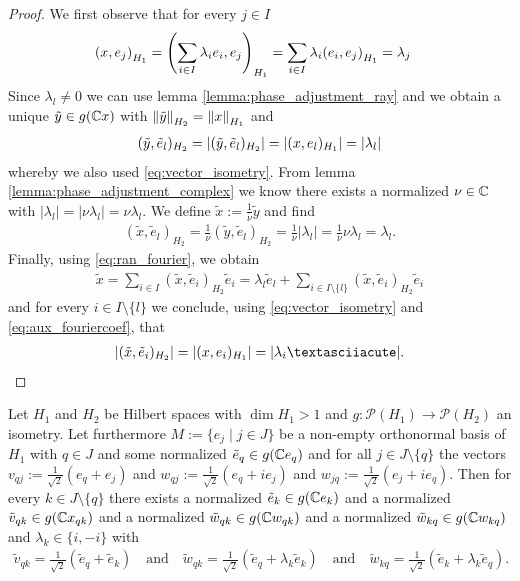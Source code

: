 \begin{proof}
	We first observe that for every $j \in I$ 
	\begin{align}
		\pbraces{x, e_j}_{H_1} &= \pbraces{\sum_{i \in I} \lambda_i e_i, e_j}_{H_1} = \sum_{i \in I} \lambda_i \pbraces{e_i, e_j}_{H_1} = \lambda_j \label{eq:aux_fouriercoef}
	\end{align}
	Since $\lambda_l \neq 0$ we can use lemma \ref{lemma:phase_adjustment_ray} and we obtain a unique $\tilde{y} \in g(\C x)$ with $\norm[H_2]{\tilde{y}} = \norm[H_1]{x}$ and 
	\begin{align*}
		(\tilde{y}, \tilde{e}_l)_{H_2} = |(\tilde{y}, \tilde{e}_l)_{H_2}| = |(x, e_l)_{H_1}| = \vbraces{\lambda_l}
	\end{align*}
	whereby we also used \eqref{eq:vector_isometry}. From lemma \ref{lemma:phase_adjustment_complex} we know there exists a normalized $\nu \in \C$ with $|\lambda_l| = |\nu \lambda_l| = \nu \lambda_l$. We define $\tilde{x} := \frac{1}{\nu} \tilde{y}$ and find
	\begin{align*}
		(\tilde{x}, \tilde{e}_l)_{H_2} = \frac{1}{\nu} (\tilde{y}, \tilde{e}_l)_{H_2} = \frac{1}{\nu} |\lambda_l| = \frac{1}{\nu} \nu \lambda_l = \lambda_l.
	\end{align*} 
	Finally, using \eqref{eq:ran_fourier}, we obtain
	\begin{align*}
		\tilde{x} = \sum_{i \in I} (\tilde{x}, \tilde{e}_i)_{H_2} \tilde{e}_i = \lambda_l \tilde{e}_l + \sum_{i \in I \setminus \{l\}} (\tilde{x}, \tilde{e}_i)_{H_2} \tilde{e}_i 
	\end{align*}
	and for every $i \in I \setminus \{l\}$ we conclude, using \eqref{eq:vector_isometry} and \eqref{eq:aux_fouriercoef}, that
	\begin{align*}
		\vbraces{(\tilde{x}, \tilde{e}_i)_{H_2}} = |(x, e_i)_{H_1}| = |\lambda_i´|.
	\end{align*}
\end{proof}


\begin{lemma} \label{lemma:function_on_onb}
	Let $H_1$ and $H_2$ be Hilbert spaces with $\dim H_1 > 1$ and $g: \mathcal{P}(H_1) \to \mathcal{P}(H_2)$ an isometry. Let furthermore $M := \{e_j \mid j \in J\}$ be a non-empty orthonormal basis of $H_1$ with $q \in J$ and some normalized $\tilde{e}_q \in g(\C e_q)$  and for all $j \in J \setminus \{q\}$ the vectors $v_{qj} := \frac{1}{\sqrt{2}} (e_q + e_j)$ and $w_{qj} := \frac{1}{\sqrt{2}}(e_q + ie_j)$ and $w_{jq} := \frac{1}{\sqrt{2}}(e_j + ie_q)$. Then for every $k \in J \setminus \{q\}$ there exists a normalized $\tilde{e}_k \in g(\C e_k)$ and a normalized $\tilde{v}_{qk} \in g(\C x_{qk})$ and a normalized $\tilde{w}_{qk} \in g(\C w_{qk})$ and a normalized $\tilde{w}_{kq} \in g(\C w_{kq})$ and $\lambda_k \in \{i, -i\}$ with
	\begin{align*}
		\tilde{v}_{qk} = \frac{1}{\sqrt{2}}(\tilde{e}_{q} + \tilde{e}_k) \quad \text{and} \quad \tilde{w}_{qk} = \frac{1}{\sqrt{2}}(\tilde{e}_q + \lambda_k \tilde{e}_k) \quad \text{and} \quad \tilde{w}_{kq} = \frac{1}{\sqrt{2}} (\tilde{e}_k + \lambda_k \tilde{e}_q).
	\end{align*}
\end{lemma}

